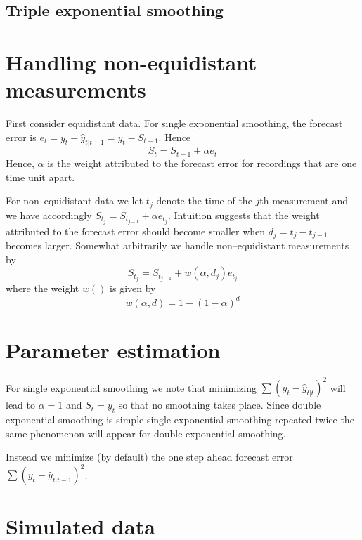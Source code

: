 \documentclass[10pt]{article}\usepackage[]{graphicx}\usepackage[]{color}
\begin{document}
\subsection{Triple exponential smoothing}
\label{sec:triple-expon-smooth}






\section{Handling non-equidistant measurements}
\label{sec:handl-non-equid}

First consider equidistant data.  For single exponential smoothing,
the forecast error is $e_t=y_t-\hat y_{t|t-1}=y_t - S_{t-1}$. Hence
\begin{displaymath}
  S_t = S_{t-1} + \alpha e_t
\end{displaymath}
Hence, $\alpha$ is the weight attributed to the forecast error for
recordings that are one time unit apart.

For non--equidistant data we let $t_j$ denote the time of the $j$th
measurement and we have accordingly
$S_{t_j} = S_{t_{j-1}} + \alpha e_{t_j}$. Intuition suggests that the
weight attributed to the forecast error should become smaller when
$d_j = t_j - t_{j-1}$ becomes larger. Somewhat arbitrarily we handle non--equidistant measurements by
\begin{displaymath}
  S_{t_j} = S_{t_{j-1}} + w(\alpha, d_j) e_{t_j}  
\end{displaymath}
where the weight $w()$ is given by
\begin{displaymath}
  w(\alpha, d) = 1 - (1-\alpha)^{d}
\end{displaymath}


\section{Parameter estimation}
\label{sec:parameter-estimation}

For single exponential smoothing we note that minimizing
$\sum (y_t - \hat y_{t|t})^2$ will lead to $\alpha=1$ and $S_t=y_t$ so
that no smoothing takes place. Since double exponential smoothing is
simple single exponential smoothing repeated twice the same phenomenon
will appear for double exponential smoothing.


Instead we minimize (by default) the
one step ahead forecast error $\sum (y_t - \hat y_{t|t-1})^2$.


\section{Simulated data}
\label{sec:simulated-data}
\end{document}
